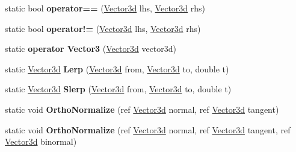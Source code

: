 \begin{DoxyCompactItemize}
static bool {\bfseries operator==} (\hyperlink{struct_unity_engine_1_1_vector3d}{Vector3d} lhs, \hyperlink{struct_unity_engine_1_1_vector3d}{Vector3d} rhs)
\item 
\mbox{\label{struct_unity_engine_1_1_vector3d_a6666f7c28524384b2929a7e41d71978a}} 
static bool {\bfseries operator!=} (\hyperlink{struct_unity_engine_1_1_vector3d}{Vector3d} lhs, \hyperlink{struct_unity_engine_1_1_vector3d}{Vector3d} rhs)
\item 
\mbox{\label{struct_unity_engine_1_1_vector3d_add8275b06ebc0a571b143b8b96b3f1f6}} 
static {\bfseries operator Vector3} (\hyperlink{struct_unity_engine_1_1_vector3d}{Vector3d} vector3d)
\item 
\mbox{\label{struct_unity_engine_1_1_vector3d_adc2ba969a9b59afcc12862e008e5662a}} 
static \hyperlink{struct_unity_engine_1_1_vector3d}{Vector3d} {\bfseries Lerp} (\hyperlink{struct_unity_engine_1_1_vector3d}{Vector3d} from, \hyperlink{struct_unity_engine_1_1_vector3d}{Vector3d} to, double t)
\item 
\mbox{\label{struct_unity_engine_1_1_vector3d_a2a680d415e8ad6d100aef838d73a71d9}} 
static \hyperlink{struct_unity_engine_1_1_vector3d}{Vector3d} {\bfseries Slerp} (\hyperlink{struct_unity_engine_1_1_vector3d}{Vector3d} from, \hyperlink{struct_unity_engine_1_1_vector3d}{Vector3d} to, double t)
\item 
\mbox{\label{struct_unity_engine_1_1_vector3d_aa627f58e5e64da8c3106df10f40ea8a0}} 
static void {\bfseries Ortho\+Normalize} (ref \hyperlink{struct_unity_engine_1_1_vector3d}{Vector3d} normal, ref \hyperlink{struct_unity_engine_1_1_vector3d}{Vector3d} tangent)
\item 
\mbox{\label{struct_unity_engine_1_1_vector3d_a65cedffcca4af2faf8a0c43e74b48967}} 
static void {\bfseries Ortho\+Normalize} (ref \hyperlink{struct_unity_engine_1_1_vector3d}{Vector3d} normal, ref \hyperlink{struct_unity_engine_1_1_vector3d}{Vector3d} tangent, ref \hyperlink{struct_unity_engine_1_1_vector3d}{Vector3d} binormal)
\item 
\mbox{\label{struct_unity_engine_1_1_vector3d_a725d6c801b1eb7d7395ede7b630d994d}} 

\end{DoxyCompactItemize}
